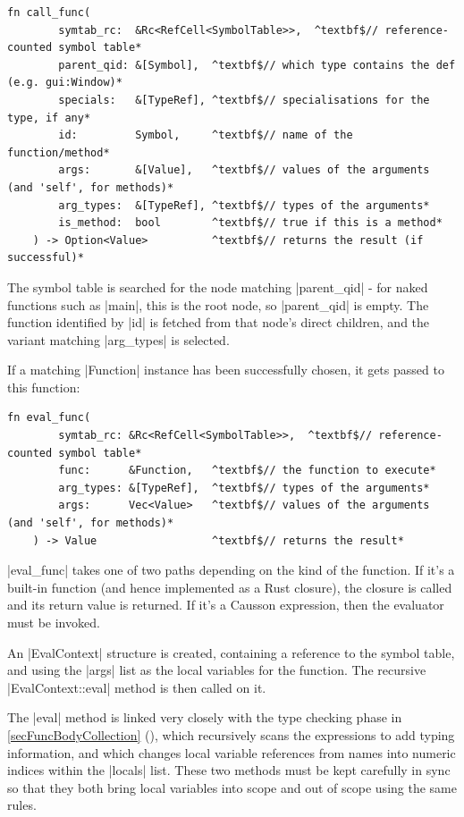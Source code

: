 \documentclass[11pt]{report}
\begin{document}
\begin{Verbatim}[gobble=4,commandchars=^$*]
    fn call_func(
        symtab_rc:  &Rc<RefCell<SymbolTable>>,  ^textbf$// reference-counted symbol table*
        parent_qid: &[Symbol],  ^textbf$// which type contains the def (e.g. gui:Window)*
        specials:   &[TypeRef], ^textbf$// specialisations for the type, if any*
        id:         Symbol,     ^textbf$// name of the function/method*
        args:       &[Value],   ^textbf$// values of the arguments (and 'self', for methods)*
        arg_types:  &[TypeRef], ^textbf$// types of the arguments*
        is_method:  bool        ^textbf$// true if this is a method*
    ) -> Option<Value>          ^textbf$// returns the result (if successful)*
\end{Verbatim}

The symbol table is searched for the node matching |parent_qid| - for naked functions such as |main|, this is the root node, so |parent_qid| is empty. The function identified by |id| is fetched from that node's direct children, and the variant matching |arg_types| is selected.

If a matching |Function| instance has been successfully chosen, it gets passed to this function:

\begin{Verbatim}[gobble=4,commandchars=^$*]
    fn eval_func(
        symtab_rc: &Rc<RefCell<SymbolTable>>,  ^textbf$// reference-counted symbol table*
        func:      &Function,   ^textbf$// the function to execute*
        arg_types: &[TypeRef],  ^textbf$// types of the arguments*
        args:      Vec<Value>   ^textbf$// values of the arguments (and 'self', for methods)*
    ) -> Value                  ^textbf$// returns the result*
\end{Verbatim}

|eval_func| takes one of two paths depending on the kind of the function. If it's a built-in function (and hence implemented as a Rust closure), the closure is called and its return value is returned. If it's a Causson expression, then the evaluator must be invoked.

An |EvalContext| structure is created, containing a reference to the symbol table, and using the |args| list as the local variables for the function. The recursive |EvalContext::eval| method is then called on it.

The |eval| method is linked very closely with the type checking phase in \cref{secFuncBodyCollection} (\emph{}), which recursively scans the expressions to add typing information, and which changes local variable references from names into numeric indices within the |locals| list. These two methods must be kept carefully in sync so that they both bring local variables into scope and out of scope using the same rules.
\end{document}
